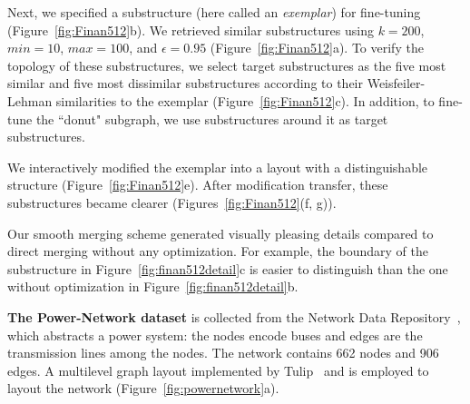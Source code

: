 Next, we specified a substructure (here called an \textit{exemplar}) for fine-tuning (Figure~\ref{fig:Finan512}b). 
We retrieved similar substructures %
using
$k = 200$, $min=10$, $max=100$, and $\epsilon=0.95$ (Figure~\ref{fig:Finan512}a). 
 To verify the topology of these substructures, we select 
target substructures as the five most similar and five most dissimilar substructures according to their Weisfeiler-Lehman similarities to the exemplar (Figure~\ref{fig:Finan512}c).
In addition, to fine-tune the ``donut" subgraph, we use substructures around it 
as target substructures.

We interactively modified the exemplar into a layout with a distinguishable structure (Figure~\ref{fig:Finan512}e).
After modification transfer, these substructures became clearer (Figures~\ref{fig:Finan512}(f, g)). 

Our smooth merging scheme generated 
visually pleasing details compared to direct merging without any optimization. For example, the 
boundary
of the substructure in Figure~\ref{fig:finan512detail}c is easier to distinguish than the one without optimization in Figure~\ref{fig:finan512detail}b.

\textbf{The Power-Network dataset} is collected from the Network Data Repository~\cite{nr}, which abstracts a power system: the nodes encode buses and edges are the transmission lines among the nodes. The network contains 662 nodes and 906 edges. 
A multilevel graph layout implemented by Tulip~\cite{auber2004tulip} and  is employed to layout the network (Figure~\ref{fig:powernetwork}a).

